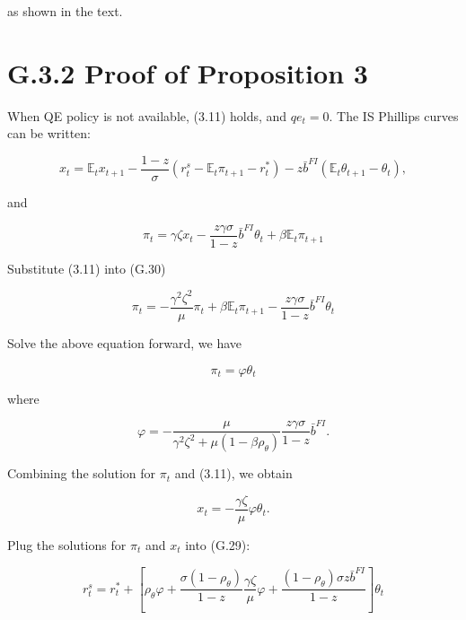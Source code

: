\documentclass[10pt]{article}
\begin{document}
as shown in the text.

\section*{G.3.2 Proof of Proposition 3}
When QE policy is not available, (3.11) holds, and $q e_{t}=0$. The IS Phillips curves can be written:

\begin{equation*}
x_{t}=\mathbb{E}_{t} x_{t+1}-\frac{1-z}{\sigma}\left(r_{t}^{s}-\mathbb{E}_{t} \pi_{t+1}-r_{t}^{*}\right)-z \bar{b}^{F I}\left(\mathbb{E}_{t} \theta_{t+1}-\theta_{t}\right), \tag{G.29}
\end{equation*}

and

\begin{equation*}
\pi_{t}=\gamma \zeta x_{t}-\frac{z \gamma \sigma}{1-z} \bar{b}^{F I} \theta_{t}+\beta \mathbb{E}_{t} \pi_{t+1} \tag{G.30}
\end{equation*}

Substitute (3.11) into (G.30)

\begin{equation*}
\pi_{t}=-\frac{\gamma^{2} \zeta^{2}}{\mu} \pi_{t}+\beta \mathbb{E}_{t} \pi_{t+1}-\frac{z \gamma \sigma}{1-z} \bar{b}^{F I} \theta_{t} \tag{G.31}
\end{equation*}

Solve the above equation forward, we have

\begin{equation*}
\pi_{t}=\varphi \theta_{t} \tag{G.32}
\end{equation*}

where

\begin{equation*}
\varphi=-\frac{\mu}{\gamma^{2} \zeta^{2}+\mu\left(1-\beta \rho_{\theta}\right)} \frac{z \gamma \sigma}{1-z} \bar{b}^{F I} . \tag{G.33}
\end{equation*}

Combining the solution for $\pi_{t}$ and (3.11), we obtain

\begin{equation*}
x_{t}=-\frac{\gamma \zeta}{\mu} \varphi \theta_{t} . \tag{G.34}
\end{equation*}

Plug the solutions for $\pi_{t}$ and $x_{t}$ into (G.29):

\begin{equation*}
r_{t}^{s}=r_{t}^{*}+\left[\rho_{\theta} \varphi+\frac{\sigma\left(1-\rho_{\theta}\right)}{1-z} \frac{\gamma \zeta}{\mu} \varphi+\frac{\left(1-\rho_{\theta}\right) \sigma z \bar{b}^{F I}}{1-z}\right] \theta_{t} \tag{G.35}
\end{equation*}
\end{document}
